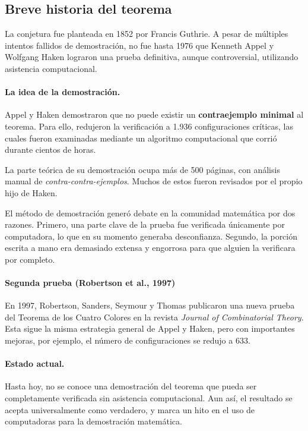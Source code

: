 \subsection*{Breve historia del teorema}

La conjetura fue planteada en 1852 por Francis Guthrie. A pesar de múltiples intentos fallidos de demostración, no fue hasta 1976 que Kenneth Appel y Wolfgang Haken lograron una prueba definitiva, aunque controversial, utilizando asistencia computacional.

\paragraph{La idea de la demostración.}
Appel y Haken demostraron que no puede existir un \textbf{contraejemplo minimal} al teorema. Para ello, redujeron la verificación a 1.936 configuraciones críticas, las cuales fueron examinadas mediante un algoritmo computacional que corrió durante cientos de horas.

La parte teórica de su demostración ocupa más de 500 páginas, con análisis manual de \textit{contra-contra-ejemplos}. Muchos de estos fueron revisados por el propio hijo de Haken.

El método de demostración generó debate en la comunidad matemática por dos razones. Primero, una parte clave de la prueba fue verificada únicamente por computadora, lo que en su momento generaba desconfianza.
Segundo, la porción escrita a mano era demasiado extensa y engorrosa para que alguien la verificara por completo.


\paragraph{Segunda prueba (Robertson et al., 1997)}

En 1997, Robertson, Sanders, Seymour y Thomas publicaron una nueva prueba del Teorema de los Cuatro Colores en la revista \textit{Journal of Combinatorial Theory}. Esta sigue la misma estrategia general de Appel y Haken, pero con importantes mejoras, por ejemplo, el número de configuraciones se redujo a 633.


\paragraph{Estado actual.} Hasta hoy, no se conoce una demostración del teorema que pueda ser completamente verificada sin asistencia computacional. Aun así, el resultado se acepta universalmente como verdadero, y marca un hito en el uso de computadoras para la demostración matemática.


